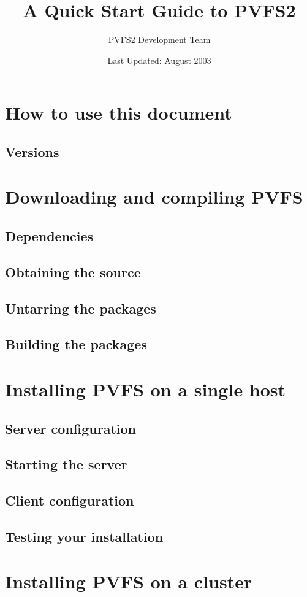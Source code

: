 \documentclass[11pt, letterpaper]{article}
\title{A Quick Start Guide to PVFS2}
\author{ PVFS2 Development Team }
\date{ Last Updated: August 2003 }
\begin{document}
\maketitle

\tableofcontents

\newpage

\thispagestyle{empty}

\setlength{\parindent}{0.0cm}

\section{How to use this document}

\subsection{Versions}

\section{Downloading and compiling PVFS}

\subsection{Dependencies}

\subsection{Obtaining the source}

\subsection{Untarring the packages}

\subsection{Building the packages}

\section{Installing PVFS on a single host}

\subsection{Server configuration}

\subsection{Starting the server}

\subsection{Client configuration}

\subsection{Testing your installation}

\section{Installing PVFS on a cluster}
\end{document}
